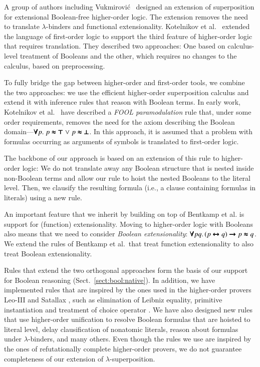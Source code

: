 A group of authors including Vukmirovi\'c\ \cite{bbtvw-21-sup-lam} designed an
extension of superposition for extensional Boolean-free higher-order logic. The extension removes the need to translate
$\lambda$-binders and functional extensionality. Kotelnikov et al.\
\cite{kotelnikov-15-fool,kotelnikov-16-fool} extended the language of
first-order logic to support the third feature of higher-order logic that
requires translation. They described two approaches: One based on calculus-level
treatment of Booleans and the other, which requires no changes to the calculus,
based on preprocessing.

 To fully bridge the gap between higher-order and first-order tools,
we combine the two approaches: we use the efficient higher-order superposition
calculus and extend it with inference rules that reason with
Boolean terms. In early work, Kotelnikov et al.\ 
\cite{kotelnikov-15-fool} have described a \emph{FOOL paramodulation}
rule that, under some order requirements, removes the need for the axiom
describing the Boolean domain---$\pmb{\forall} p. \; p \pmb{\approx} \pmb{\top} \mathrel\lor p
\pmb{\approx} \pmb{\bot}$. In this approach, it is assumed that a problem with formulas occurring as
arguments of symbols is translated to first-order logic. 

The backbone of our approach is based on an extension of this rule to higher-order
logic: We do not translate away any Boolean structure that is nested inside
non-Boolean terms and allow our rule to hoist the nested Booleans to the
literal level. Then, we clausify the resulting formula (i.e., a clause containing formulas in literals) using a new rule.


 An important feature that we inherit by building on top of Bentkamp
et al. \cite{bbtvw-21-sup-lam} is support for (function) extensionality. Moving to higher-order
logic with Booleans also means that we need to consider \emph{Boolean extensionality}: $\pmb{\forall} pq. \, (p
\pmb{\leftrightarrow} q) \pmb{\rightarrow} p \pmb{\approx} q$. We extend the rules of Bentkamp et al.\ 
that treat function extensionality to also treat Boolean extensionality.

\looseness=-1
Rules that extend the two orthogonal approaches form the basis of our support
for Boolean reasoning (Sect.~\ref{sect:bool:native}). In addition, we have
implemented rules that are inspired by the ones used in the
higher-order provers Leo-III \cite{sb-21-leo3} and Satallax
\cite{cb-12-satallax}, such as elimination of Leibniz equality, primitive
instantiation and treatment of choice operator \cite{pa-01-classical-ty-thy}. We
have also designed new rules that use higher-order unification to resolve
Boolean formulas that are hoisted to literal level, delay clausification of nonatomic
literals, reason about formulas under $\lambda$-binders, and many others. Even
though the rules we use are inspired by the ones of refutationally complete
higher-order provers, we do not guarantee completeness of our extension of
$\lambda$-superposition.


